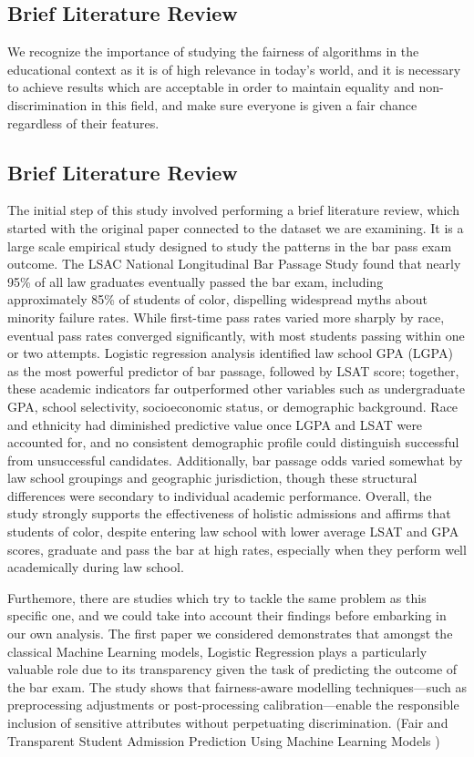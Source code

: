 \documentclass{article}
\begin{document}
\subsection{Brief Literature Review}

We recognize the importance of studying the fairness of algorithms in the educational context as it is
 of high relevance in today’s world, and it is necessary to achieve results which are acceptable in order
 to maintain equality and non-discrimination in this field, and make sure everyone is given a fair chance
 regardless of their features.

\subsection{Brief Literature Review}

The initial step of this study involved performing a brief literature review, which started with the original paper connected to the dataset we are examining. It is a large scale empirical study designed to study the patterns in the bar pass exam outcome. The LSAC National Longitudinal Bar Passage Study \cite{lsacdata} found that nearly 95\% of all law graduates eventually passed the bar exam, including approximately 85\% of students of color, dispelling widespread myths about minority failure rates. While first-time pass rates varied more sharply by race, eventual pass rates converged significantly, with most students passing within one or two attempts. Logistic regression analysis identified law school GPA (LGPA) as the most powerful predictor of bar passage, followed by LSAT score; together, these academic indicators far outperformed other variables such as undergraduate GPA, school selectivity, socioeconomic status, or demographic background. Race and ethnicity had diminished predictive value once LGPA and LSAT were accounted for, and no consistent demographic profile could distinguish successful from unsuccessful candidates. Additionally, bar passage odds varied somewhat by law school groupings and geographic jurisdiction, though these structural differences were secondary to individual academic performance. Overall, the study strongly supports the effectiveness of holistic admissions and affirms that students of color, despite entering law school with lower average LSAT and GPA scores, graduate and pass the bar at high rates, especially when they perform well academically during law school.

Furthemore, there are studies which try to tackle the same problem as this specific one, and we could take into account their findings before embarking in our own analysis. The first paper we considered demonstrates that amongst the classical Machine Learning models, Logistic Regression plays a particularly valuable role due to its transparency given the task of predicting the outcome of the bar exam. The study shows that fairness-aware modelling techniques—such as preprocessing adjustments or post-processing calibration—enable the responsible inclusion of sensitive attributes without perpetuating discrimination. (Fair and Transparent Student Admission Prediction Using Machine Learning Models  \cite{unknown2023fairadmission})
\end{document}
